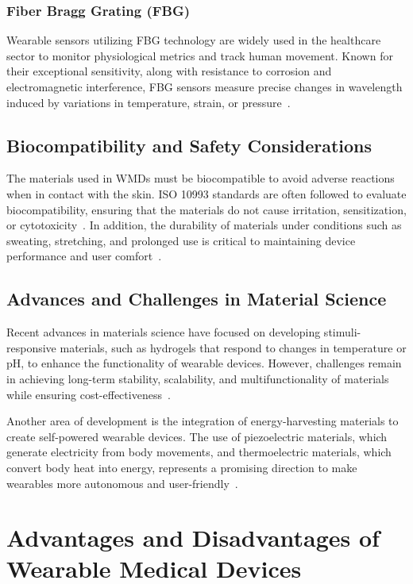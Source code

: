 \documentclass[journal]{IEEEtran}
\begin{document}
        \subsubsection{Fiber Bragg Grating (FBG)}

        Wearable sensors utilizing FBG technology are widely used in the healthcare sector to monitor physiological metrics and track human movement. Known for their exceptional sensitivity, along with resistance to corrosion and electromagnetic interference, FBG sensors measure precise changes in wavelength induced by variations in temperature, strain, or pressure~\cite{Song2025}. 

    \subsection{Biocompatibility and Safety Considerations}

    The materials used in WMDs must be biocompatible to avoid adverse reactions when in contact with the skin. ISO 10993 standards are often followed to evaluate biocompatibility, ensuring that the materials do not cause irritation, sensitization, or cytotoxicity~\cite{ISO2018}. In addition, the durability of materials under conditions such as sweating, stretching, and prolonged use is critical to maintaining device performance and user comfort~\cite{Chen2020}.

    \subsection{Advances and Challenges in Material Science}

    Recent advances in materials science have focused on developing stimuli-responsive materials, such as hydrogels that respond to changes in temperature or pH, to enhance the functionality of wearable devices. However, challenges remain in achieving long-term stability, scalability, and multifunctionality of materials while ensuring cost-effectiveness~\cite{Trovato2022}.

    Another area of development is the integration of energy-harvesting materials to create self-powered wearable devices. The use of piezoelectric materials, which generate electricity from body movements, and thermoelectric materials, which convert body heat into energy, represents a promising direction to make wearables more autonomous and user-friendly~\cite{Pantrangi2024}.

\section{Advantages and Disadvantages of Wearable Medical Devices}
\label{7.Advantages}
\end{document}
